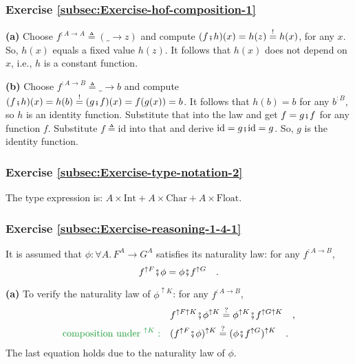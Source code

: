 \subsubsection*{Exercise \ref{subsec:Exercise-hof-composition-1}}

\textbf{(a)} Choose $f^{:A\rightarrow A}\triangleq(\_\rightarrow z)$
and compute $(f\bef h)(x)=h(z)\overset{!}{=}h(x)$, for any $x$.
So, $h(x)$ equals a fixed value $h(z)$. It follows that $h(x)$
does not depend on $x$, i.e., $h$ is a constant function.

\textbf{(b)} Choose $f^{:A\rightarrow B}\triangleq\_\rightarrow b$
and compute $(f\bef h)(x)=h(b)\overset{!}{=}(g\bef f)(x)=f(g(x))=b$.
It follows that $h(b)=b$ for any $b^{:B}$, so $h$ is an identity
function. Substitute that into the law and get $f=g\bef f$ for any
function $f$. Substitute $f\triangleq\text{id}$ into that and derive
$\text{id}=g\bef\text{id}=g$. So, $g$ is the identity function.


\subsubsection*{Exercise \ref{subsec:Exercise-type-notation-2}}

The type expression is: $A\times\text{Int}+A\times\text{Char}+A\times\text{Float}$.


\subsubsection*{Exercise \ref{subsec:Exercise-reasoning-1-4-1}}

It is assumed that $\phi:\forall A.\,F^{A}\rightarrow G^{A}$ satisfies
its naturality law: for any $f^{:A\rightarrow B}$,
\[
f^{\uparrow F}\bef\phi=\phi\bef f^{\uparrow G}\quad.
\]

\textbf{(a)} To verify the naturality law of $\phi^{\uparrow K}$:
for any $f^{:A\rightarrow B}$,
\begin{align*}
 & f^{\uparrow F\uparrow K}\bef\phi^{\uparrow K}\overset{?}{=}\phi^{\uparrow K}\bef f^{\uparrow G\uparrow K}\quad,\\
{\color{greenunder}\text{composition under }^{\uparrow K}:}\quad & (f^{\uparrow F}\bef\phi)^{\uparrow K}\overset{?}{=}(\phi\bef f^{\uparrow G})^{\uparrow K}\quad.
\end{align*}
The last equation holds due to the naturality law of $\phi$.

